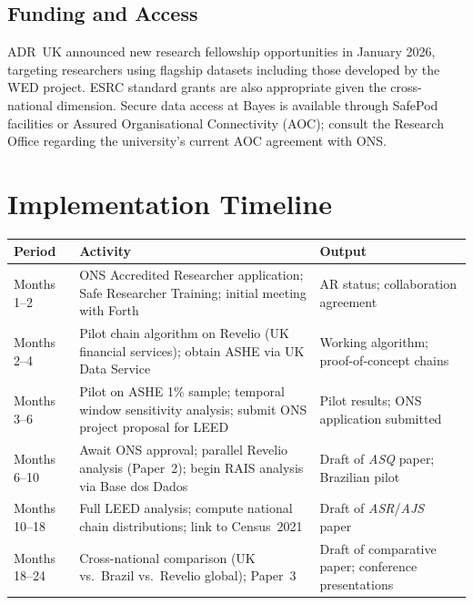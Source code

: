 \documentclass[a4paper]{tufte-handout}
\begin{document}
\subsection{Funding and Access}

ADR~UK announced new research fellowship opportunities in January 2026, targeting researchers using flagship datasets including those developed by the WED project. ESRC standard grants are also appropriate given the cross-national dimension. Secure data access at Bayes is available through SafePod facilities or Assured Organisational Connectivity (AOC); consult the Research Office regarding the university's current AOC agreement with ONS\@.


\section{Implementation Timeline}

\begin{fullwidth}
\smallskip
\small
\begin{tabularx}{\linewidth}{@{}l X X@{}}
  \toprule
  \textbf{Period} & \textbf{Activity} & \textbf{Output} \\
  \midrule
  Months 1--2   & ONS Accredited Researcher application; Safe Researcher Training; initial meeting with Forth & AR status; collaboration agreement \\[4pt]
  Months 2--4   & Pilot chain algorithm on Revelio (UK financial services); obtain ASHE via UK Data Service & Working algorithm; proof-of-concept chains \\[4pt]
  Months 3--6   & Pilot on ASHE 1\% sample; temporal window sensitivity analysis; submit ONS project proposal for LEED & Pilot results; ONS application submitted \\[4pt]
  Months 6--10  & Await ONS approval; parallel Revelio analysis (Paper~2); begin RAIS analysis via Base dos Dados & Draft of \emph{ASQ} paper; Brazilian pilot \\[4pt]
  Months 10--18 & Full LEED analysis; compute national chain distributions; link to Census~2021 & Draft of \emph{ASR}/\emph{AJS} paper \\[4pt]
  Months 18--24 & Cross-national comparison (UK vs.\ Brazil vs.\ Revelio global); Paper~3 & Draft of comparative paper; conference presentations \\
  \bottomrule
\end{tabularx}
\smallskip
\end{fullwidth}
\end{document}
